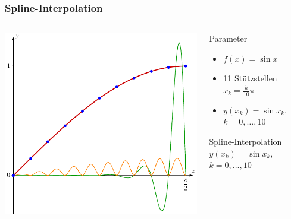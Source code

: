 %
%
%
\bgroup
{}
\begin{frame}[t]
\setlength{\abovedisplayskip}{5pt}
\setlength{\belowdisplayskip}{5pt}
\frametitle{Spline-Interpolation}
\vspace{-20pt}
\begin{columns}[t,onlytextwidth]
\begin{column}{0.60\textwidth}
\vspace{-10pt}
\begin{center}
\includegraphics[width=\textwidth]{../../buch/chapters/030-nichtdiff/images/sinspline.pdf}
\end{center}
\end{column}
\begin{column}{0.36\textwidth}
\begin{block}{Parameter}
\begin{itemize}
\item
$f(x) = \sin x$
\item
11 Stützstellen $x_k = \frac{k}{10}\pi$
\item
$y(x_k) = \sin x_k$, $k=0,\dots,10$
\end{itemize}
\vspace*{-10pt}
\end{block}
\begin{block}{Spline-Interpolation}
$y(x_k) = \sin x_k$, $k=0,\dots,10$


\end{block}
\end{column}
\end{columns}
\end{frame}
